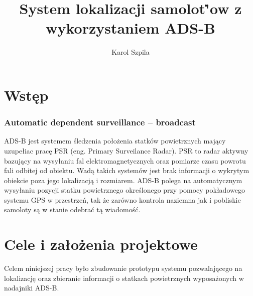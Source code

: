 \documentclass[eng,printmode]{mgr}
\title{System lokalizacji samolot\.'ow z wykorzystaniem ADS-B}
\author{Karol Szpila}
\begin{document}

\maketitle %

\tableofcontents %

\let\cleardoublepage\clearpage %

\chapter{ Wstęp }

\subsection{Automatic dependent surveillance – broadcast}
ADS-B jest systemem śledzenia położenia statków powietrznych mający uzupełiac pracę PSR (eng. Primary Surveilance Radar). PSR to radar aktywny bazujący na wysyłaniu fal elektromagnetycznych oraz pomiarze czasu powrotu fali odbitej od obiektu. Wadą takich systemów jest brak informacji o wykrytym obiekcie poza jego lokalizacją i rozmiarem. ADS-B polega na automatycznym wysyłaniu pozycji statku powietrznego określonego przy pomocy pokładowego systemu GPS w przestrzeń, tak że zarówno kontrola naziemna jak i pobliskie samoloty są w stanie odebrać tą wiadomość. 

\chapter{ Cele i założenia projektowe }
Celem niniejszej pracy by\l{}o zbudowanie prototypu systemu pozwalającego na lokalizację oraz zbieranie informacji o  statkach powietrznych wyposażonych w nadajniki ADS-B.                                                                                                                                                                                                                                                                                                                                                            
\end{document}
